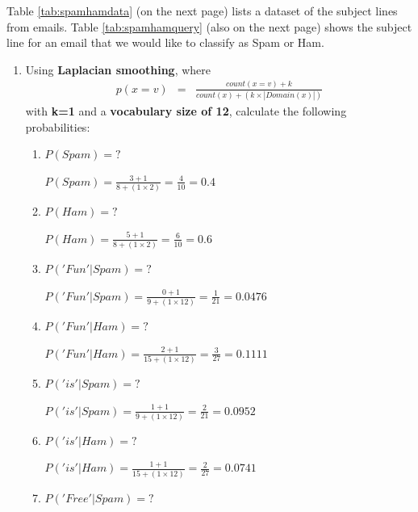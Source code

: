 \documentclass[--SOLUTION-OPTION--]{ditpaper}
\begin{document}
\newpage

			

	

\question Table \ref{tab:spamhamdata} (on the next page) lists a dataset of the subject lines from emails. Table \ref{tab:spamhamquery} (also on the next page) shows the subject line for an email that we would like to classify as Spam or Ham. 
	\begin{enumerate}
		\item Using \textbf{Laplacian smoothing}, where 
		\begin{eqnarray*}
		p(x=v) &=& \frac{count(x=v)+k}{count(x) +( k \times |Domain(x)|)}
		\end{eqnarray*}
		with \textbf{k=1} and a \textbf{vocabulary size of 12}, calculate the following probabilities:
			\begin{enumerate}
				\item $P(Spam)=?$
					\begin{answer}
						$P(Spam) = \frac{3+1}{8 + (1 \times 2)} = \frac{4}{10} = 0.4$
					\end{answer}
				\item $P(Ham)=?$
					\begin{answer}
						$P(Ham) = \frac{5+1}{8 + (1 \times 2)} = \frac{6}{10} = 0.6$
					\end{answer}
				\item $P('Fun'|Spam)=?$
					\begin{answer}
						$P('Fun'|Spam) = \frac{0+1}{9 + (1 \times 12)} = \frac{1}{21} = 0.0476$
					\end{answer}
				\item $P('Fun'|Ham)=?$
					\begin{answer}
						$P('Fun'|Ham) = \frac{2+1}{15 + (1 \times 12)} = \frac{3}{27} = 0.1111$
					\end{answer}
				\item $P('is'|Spam)=?$
					\begin{answer}
						$P('is'|Spam) = \frac{1+1}{9 + (1 \times 12)} = \frac{2}{21} = 0.0952$
					\end{answer}
				\item $P('is'|Ham)=?$
					\begin{answer}
						$P('is'|Ham) = \frac{1+1}{15 + (1 \times 12)} = \frac{2}{27} = 0.0741$
					\end{answer}
				\item $P('Free'|Spam)=?$

\end{enumerate}
\end{enumerate}
\end{document}
